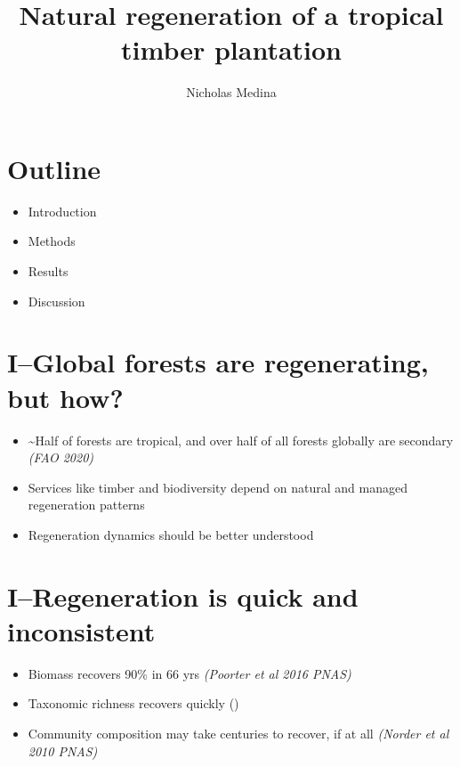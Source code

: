 \documentclass[
]{article}
\title{Natural regeneration of a tropical timber plantation}
\author{Nicholas Medina}
\date{}
\providecommand{\tightlist}{%
  \setlength{\itemsep}{0pt}\setlength{\parskip}{0pt}}
\begin{document}
\maketitle

\hypertarget{outline}{%
\section{Outline}\label{outline}}

\begin{itemize}
\tightlist
\item
  Introduction
\item
  Methods
\item
  Results
\item
  Discussion
\end{itemize}

\hypertarget{iglobal-forests-are-regenerating-but-how}{%
\section{I--Global forests are regenerating, but
how?}\label{iglobal-forests-are-regenerating-but-how}}

\begin{itemize}
\item
  \textasciitilde Half of forests are tropical, and over half of all
  forests globally are secondary \emph{(FAO 2020)}
\item
  Services like timber and biodiversity depend on natural and managed
  regeneration patterns
\item
  Regeneration dynamics should be better understood
\end{itemize}

\hypertarget{iregeneration-is-quick-and-inconsistent}{%
\section{I--Regeneration is quick and
inconsistent}\label{iregeneration-is-quick-and-inconsistent}}

\begin{itemize}
\item
  Biomass recovers 90\% in 66 yrs \emph{(Poorter et al 2016 PNAS)}
\item
  Taxonomic richness recovers quickly ()
\item
  Community composition may take centuries to recover, if at all
  \emph{(Norder et al 2010 PNAS)}
\end{itemize}
\end{document}
